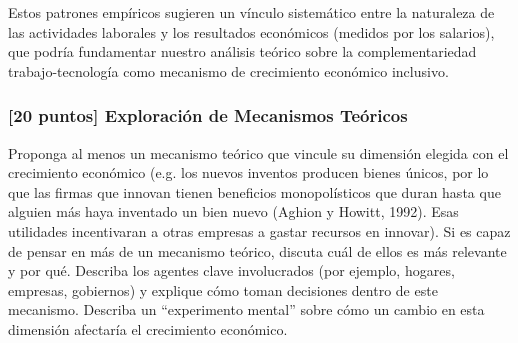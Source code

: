 \documentclass{article}
\theoremstyle{remark}
\theoremstyle{definition}
\begin{document}
\begin{tcolorbox}
Estos patrones empíricos sugieren un vínculo sistemático entre la naturaleza de las actividades laborales y los resultados económicos (medidos por los salarios), que podría fundamentar nuestro análisis teórico sobre la complementariedad trabajo-tecnología como mecanismo de crecimiento económico inclusivo.

\end{tcolorbox}

\subsubsection{[20 puntos] Exploración de Mecanismos Teóricos}

Proponga al menos un mecanismo teórico que vincule su dimensión elegida con el crecimiento económico (e.g. los nuevos inventos producen bienes únicos, por lo que las firmas que innovan tienen beneficios monopolísticos que duran hasta que alguien más haya inventado un bien nuevo (Aghion y Howitt, 1992). Esas utilidades incentivaran a otras empresas a gastar recursos en innovar). Si es capaz de pensar en más de un mecanismo teórico, discuta cuál de ellos es más relevante y por qué. Describa los agentes clave involucrados (por ejemplo, hogares, empresas, gobiernos) y explique cómo toman decisiones dentro de este mecanismo. Describa un ``experimento mental'' sobre cómo un cambio en esta dimensión afectaría el crecimiento económico.
\end{document}
